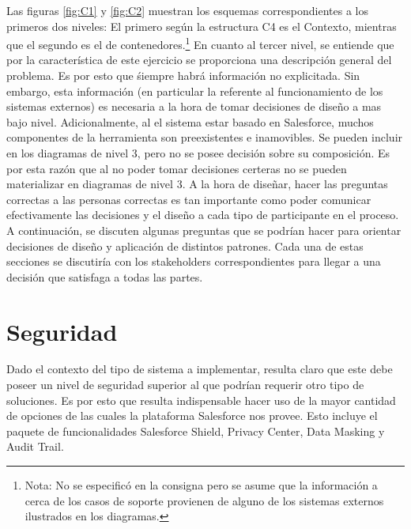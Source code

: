 \documentclass{article}
\begin{document}
Las figuras \ref{fig:C1} y \ref{fig:C2} muestran los esquemas correspondientes a los primeros dos niveles: El primero según la estructura C4 es el Contexto, mientras que el segundo es el de contenedores.\footnote{Nota: No se especificó en la consigna pero se asume que la información a cerca de los casos de soporte provienen de alguno de los sistemas externos ilustrados en los diagramas.}
\newline \newline
En cuanto al tercer nivel, se entiende que por la característica de este ejercicio se proporciona una descripción general del problema. Es por esto que śiempre habrá información no explicitada.
Sin embargo, esta información (en particular la referente al funcionamiento de los sistemas externos) es necesaria a la hora de tomar decisiones de diseño a mas bajo nivel. Adicionalmente, al el sistema estar basado en Salesforce, muchos componentes de la herramienta son preexistentes e inamovibles. Se pueden incluir en los diagramas de nivel 3, pero no se posee decisión sobre su composición.
Es por esta razón que al no poder tomar decisiones certeras no se pueden materializar en diagramas de nivel 3.
\newline \newline
A la hora de diseñar, hacer las preguntas correctas a las personas correctas es tan importante como poder comunicar efectivamente las decisiones y el diseño a cada tipo de participante en el proceso.
A continuación, se discuten algunas preguntas que se podrían hacer para orientar decisiones de diseño y aplicación de distintos patrones. Cada una de estas secciones se discutiría con los stakeholders correspondientes para llegar a una decisión que satisfaga a todas las partes.

\section{Seguridad}

Dado el contexto del tipo de sistema a implementar, resulta claro que este debe poseer un nivel de seguridad superior al que podrían requerir otro tipo de soluciones. Es por esto que resulta indispensable hacer uso de la mayor cantidad de opciones de las cuales la plataforma Salesforce nos provee.
\newline \newline
Esto incluye el paquete de funcionalidades Salesforce Shield, Privacy Center, Data Masking y Audit Trail.
\end{document}
